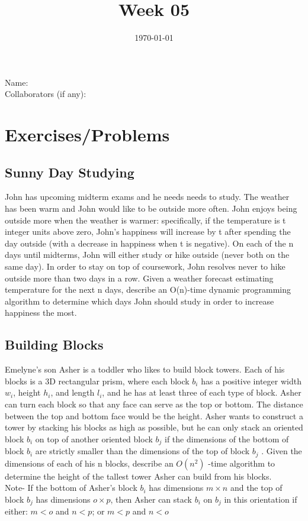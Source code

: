 \documentclass[12pt]{amsart}
\title{Week 05}
\date{\today}
\begin{document}
\maketitle


Name: 
\\

Collaborators (if any): 


\section{Exercises/Problems}

\subsection{Sunny Day Studying} 
John has upcoming midterm exams and he needs needs to study. The weather has been warm and John would like to be outside more often. John enjoys being outside more when the weather is warmer: specifically, if the temperature is t integer units above zero, John's happiness will increase by t after spending the day outside (with a decrease in happiness when t is negative). On each of the n days until midterms, John will either study or hike outside (never both on the same day). In order to stay on top of coursework, John resolves never to hike outside more than two days in a row. Given a weather forecast estimating temperature for the next n days, describe an O(n)-time dynamic programming algorithm to determine which days John should study in order to increase happiness the most.  
\\

\subsection{Building Blocks} 
Emelyne's son Asher is a toddler who likes to build block towers. Each of his blocks is a 3D rectangular prism, where each block $b_i$ has a positive integer width $w_i$, height $h_i$, and length $l_i$, and he has at least three of each type of block. Asher can turn each block so that any face can serve as the top or bottom. The distance between the top and bottom face would be the height. Asher wants to construct a tower by stacking his blocks as high as possible, but he can only stack an oriented block $b_i$ on top of another oriented block $b_j$ if the dimensions of the bottom of block $b_i$ are strictly smaller than the dimensions of the top of block $b_j$ . Given the dimensions of each of his n blocks, describe an $O(n^2)$ -time algorithm to determine the height of the tallest tower Asher can build from his blocks. 
\\

Note- If the bottom of Asher's block $b_i$ has dimensions $m \times n$ and the top of block $b_j$ has dimensions $o \times p$, then Asher can stack $b_i$  on $b_j$ in this orientation if either: $m < o$ and $n < p$; or $m < p$ and $n < o$
\\
\end{document}
